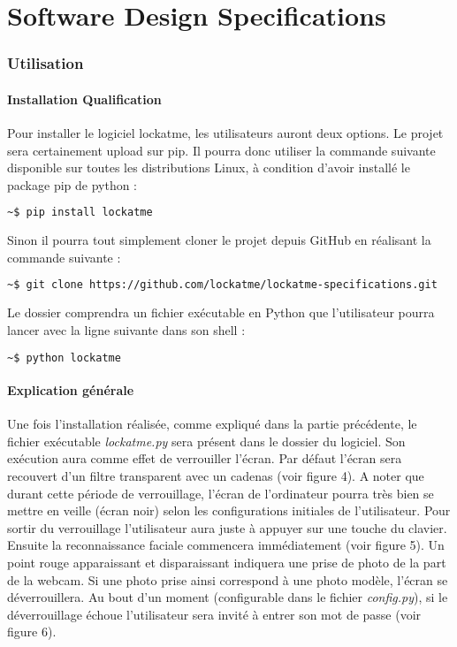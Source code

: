 \part{Software Design Specifications}
\section{Utilisation}
  \subsection{Installation Qualification}
Pour installer le logiciel lockatme, les utilisateurs auront deux options. Le
projet sera certainement upload sur pip. Il pourra donc utiliser la commande
suivante disponible sur toutes les distributions Linux, à condition d'avoir
installé le package pip de python :
\begin{lstlisting}[language=bash]
  ~$ pip install lockatme
\end{lstlisting}
Sinon il pourra tout simplement cloner le projet depuis GitHub en réalisant la
commande suivante :
\begin{lstlisting}[language=bash]
  ~$ git clone https://github.com/lockatme/lockatme-specifications.git
\end{lstlisting}
Le dossier comprendra un fichier exécutable en Python que l'utilisateur pourra
lancer avec la ligne suivante dans son shell :
\begin{lstlisting}[language=bash]
  ~$ python lockatme
\end{lstlisting}

  \subsection{Explication générale}
Une fois l'installation réalisée, comme expliqué dans la partie précédente,
le fichier exécutable \emph{lockatme.py} sera présent dans le dossier du logiciel. Son
exécution aura comme effet de verrouiller l'écran. Par défaut l'écran sera
recouvert d'un filtre transparent avec un cadenas (voir figure 4). A noter que
durant cette période de verrouillage, l'écran de l'ordinateur pourra très bien
se mettre en veille (écran noir) selon les configurations initiales de
l'utilisateur.
Pour sortir du verrouillage l'utilisateur aura juste à appuyer sur une touche
du clavier. Ensuite la reconnaissance faciale commencera immédiatement (voir
figure 5).
Un point rouge apparaissant et disparaissant indiquera une prise de
photo de la part de la webcam. Si une photo prise ainsi correspond à une photo
modèle, l'écran se déverrouillera. Au bout d'un moment (configurable dans le
fichier \emph{config.py}), si le déverrouillage échoue l'utilisateur sera invité à
entrer son mot de passe (voir figure 6).

